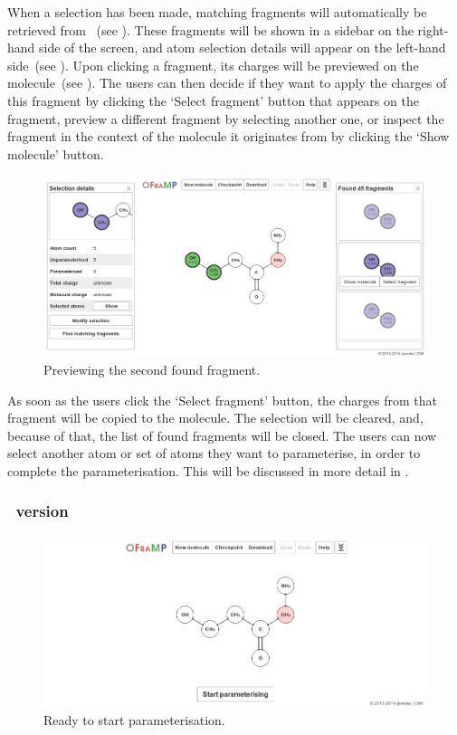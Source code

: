 When a selection has been made, matching fragments will automatically be retrieved from \omfraf~(see ). These fragments will be shown in a sidebar on the right-hand side of the screen, and atom selection details will appear on the left-hand side~(see ). Upon clicking a fragment, its charges will be previewed on the molecule~(see ). The users can then decide if they want to apply the charges of this fragment by clicking the `Select fragment' button that appears on the fragment, preview a different fragment by selecting another one, or inspect the fragment in the context of the molecule it originates from by clicking the `Show molecule' button.

\begin{figure}
\center
\includegraphics[width=.9\textwidth]{img/find_2.png}
\caption{Previewing the second found fragment.}
\end{figure}

As soon as the users click the `Select fragment' button, the charges from that fragment will be copied to the molecule. The selection will be cleared, and, because of that, the list of found fragments will be closed. The users can now select another atom or set of atoms they want to parameterise, in order to complete the parameterisation. This will be discussed in more detail in .

\subsubsection{\IDB\ version}

\begin{figure}
\center
\includegraphics[width=.9\textwidth]{img/find_3.png}
\caption{Ready to start parameterisation.}
\end{figure}

